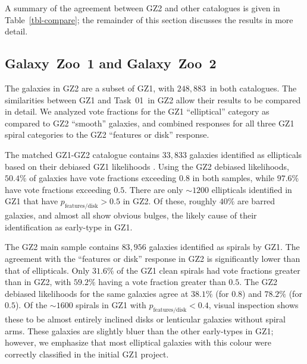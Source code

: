 \documentclass[useAMS,usenatbib]{mn2e}
\begin{document}
A summary of the agreement between GZ2 and other catalogues is given in Table~\ref{tbl-compare}; the remainder of this section discusses the results in more detail. 

\subsection{Galaxy~Zoo~1 and Galaxy~Zoo~2}\label{ssec-gz1gz2}

The galaxies in GZ2 are a subset of GZ1, with $248,883$~in both catalogues. The similarities between GZ1 and Task~01~in GZ2 allow their results to be compared in detail. We analyzed vote fractions for the GZ1 ``elliptical'' category as compared to GZ2 ``smooth'' galaxies, and combined responses for all three GZ1 spiral categories to the GZ2 ``features or disk'' response. 

The matched GZ1-GZ2 catalogue contains $33,833$ galaxies identified as ellipticals based on their debiased GZ1 likelihoods \citep{lin11}. Using the GZ2 debiased likelihoods, $50.4\%$ of galaxies have vote fractions exceeding $0.8$ in both samples, while $97.6\%$ have vote fractions exceeding $0.5$. There are only $\sim1200$ ellipticals identified in GZ1 that have $p_\mathrm{features/disk}>0.5$ in GZ2. Of these, roughly $40\%$ are barred galaxies, and almost all show obvious bulges, the likely cause of their identification as early-type in GZ1. 

The GZ2 main sample contains $83,956$ galaxies identified as spirals by GZ1. The agreement with the ``features or disk'' response in GZ2 is significantly lower than that of ellipticals. Only $31.6\%$ of the GZ1 clean spirals had vote fractions greater than in GZ2, with $59.2\%$ having a vote fraction greater than $0.5$. The GZ2 debiased likelihoods for the same galaxies agree at $38.1\%$ (for $0.8$) and $78.2\%$ (for $0.5$). Of the $\sim1600$ spirals in GZ1 with $p_\mathrm{features/disk}<0.4$, visual inspection shows these to be almost entirely inclined disks or lenticular galaxies without spiral arms. These galaxies are slightly bluer than the other early-types in GZ1; however, we emphasize that most elliptical galaxies with this colour \citep{sch09} were correctly classified in the initial GZ1 project. 
\end{document}
